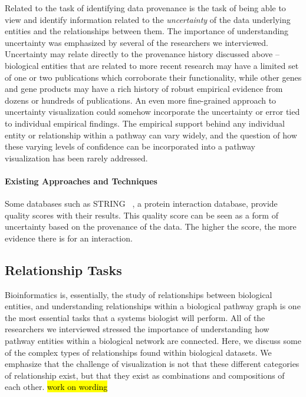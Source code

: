 Related to the task of identifying data provenance is the task of being able to view and identify information related to the \textit{uncertainty} of the data underlying entities and the relationships between them.
The importance of understanding uncertainty was emphasized by several of the researchers we interviewed.
Uncertainty may relate directly to the provenance history discussed above -- biological entities that are related to more recent research may have a limited set of one or two publications which corroborate their functionality, while other genes and gene products may have a rich history of robust empirical evidence from dozens or hundreds of publications.
An even more fine-grained approach to uncertainty visualization could somehow incorporate the uncertainty or error tied to individual empirical findings.
The empirical support behind any individual entity or relationship within a pathway can vary widely, and the question of how these varying levels of confidence can be incorporated into a pathway visualization has been rarely addressed.

\paragraph{Existing Approaches and Techniques}

Some databases such as STRING~\cite{STRING2005} , a protein interaction database, provide quality scores with their results. This quality score can be seen as a form of uncertainty based on the provenance of the data.
The higher the score, the more evidence there is for an interaction.

\subsection{Relationship Tasks}

Bioinformatics is, essentially, the study of relationships between biological entities, and understanding relationships within a biological pathway graph is one the most essential tasks that a systems biologist will perform.
All of the researchers we interviewed stressed the importance of understanding how pathway entities within a biological network are connected.
Here, we discuss some of the complex types of relationships found within biological datasets.
We emphasize that the challenge of visualization is not that these different categories of relationship exist, but that they exist as combinations and compositions of each other. \hl{work on wording}

